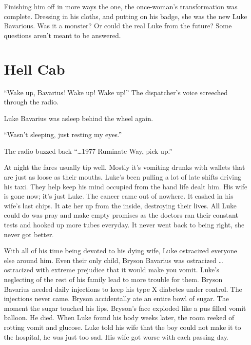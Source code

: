 Finishing him off in more ways the one, the once-woman's
transformation was complete. Dressing in his cloths, and putting on
his badge, she was the new Luke Bavarious. Was it a monster? Or
could the real Luke from the future? Some questions aren't
meant to be answered. 
 





\chapter{Hell Cab}



``Wake up, Bavarius! Wake up! Wake up!'' The
dispatcher's voice screeched through the radio.



Luke Bavarius was asleep behind the wheel again.



``Wasn't sleeping, just resting my eyes.''

The radio buzzed back ``{\ldots}1977 Ruminate Way, pick
up.''



At night the fares usually tip well. Mostly it's vomiting
drunks with wallets that are just as loose as their mouths.
Luke's been pulling a lot of late shifts driving his taxi.
They help keep his mind occupied from the hand life dealt him. His
wife is gone now; it's just Luke. The cancer came out of
nowhere. It cashed in his wife's last chips. It ate her up
from the inside, destroying their lives. All Luke could do was pray
and make empty promises as the doctors ran their constant tests and
hooked up more tubes everyday. It never went back to being right,
she never got better.



With all of his time being devoted to his dying wife, Luke
ostracized everyone else around him. Even their only child, Bryson
Bavarius was ostracized {\ldots} ostracized with extreme prejudice
that it would make you vomit. Luke's neglecting of the rest
of his family lead to more trouble for them. Bryson Bavarius needed
daily injections to keep his type X diabetes under control. The
injections never came. Bryson accidentally ate an entire bowl of
sugar. The moment the sugar touched his lips, Bryson's face
exploded like a pus filled vomit balloon. He died. When Luke found
his body weeks later, the room reeked of rotting vomit and glucose.
Luke told his wife that the boy could not make it to the hospital,
he was just too sad. His wife got worse with each passing
day.



